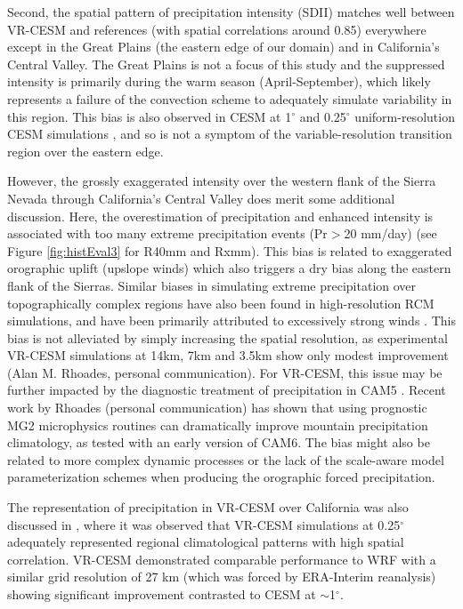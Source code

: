 \documentclass{ametsoc}
\begin{document}
Second, the spatial pattern of precipitation intensity (SDII) matches well between VR-CESM and references (with spatial correlations around 0.85) everywhere except in the Great Plains (the eastern edge of our domain) and in California's Central Valley.  The Great Plains is not a focus of this study and the suppressed intensity is primarily during the warm season (April-September), which likely represents a failure of the convection scheme to adequately simulate variability in this region.  This bias is also observed in CESM at 1$^\circ$ and 0.25$^\circ$ uniform-resolution CESM simulations \citep{small2014new}, and so is not a symptom of the variable-resolution transition region over the eastern edge.

However, the grossly exaggerated intensity over the western flank of the Sierra Nevada through California's Central Valley does merit some additional discussion. Here, the overestimation of precipitation and enhanced intensity is associated with too many extreme precipitation events (Pr$>$20 mm/day) (see Figure \ref{fig:histEval3} for R40mm and Rxmm).  This bias is related to exaggerated orographic uplift (upslope winds) which also triggers a dry bias along the eastern flank of the Sierras.  Similar biases in simulating extreme precipitation over topographically complex regions have also been found in high-resolution RCM simulations, and have been primarily attributed to excessively strong winds \citep{walker2009evaluation, singh2013precipitation}.  This bias is not alleviated by simply increasing the spatial resolution, as experimental VR-CESM simulations at 14km, 7km and 3.5km show only modest improvement (Alan M. Rhoades, personal communication). For VR-CESM, this issue may be further impacted by the diagnostic treatment of precipitation in CAM5 \citep{morrison2008new, gettelman2008new}. Recent work by Rhoades (personal communication) has shown that using prognostic MG2 microphysics routines can dramatically improve mountain precipitation climatology, as tested with an early version of CAM6. The bias might also be related to more complex dynamic processes or the lack of the scale-aware model parameterization schemes when producing the orographic forced precipitation.

The representation of precipitation in VR-CESM over California was also discussed in \cite{huang2016evaluation}, where it was observed that VR-CESM simulations at 0.25$^\circ$ adequately represented regional climatological patterns with high spatial correlation. VR-CESM demonstrated comparable performance to WRF with a similar grid resolution of 27 km (which was forced by ERA-Interim reanalysis) showing significant improvement contrasted to CESM at $\sim$1$^\circ$.
\end{document}
